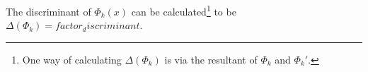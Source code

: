 The discriminant of $\Phi_{{k}}(x)$ can be calculated\footnote{One way of calculating $\Delta(\Phi_{{k}})$ is via the resultant of $\Phi_{{k}}$ and $\Phi_{{k}}'$.} to be $\Delta(\Phi_{{k}})={factor_discriminant}$.